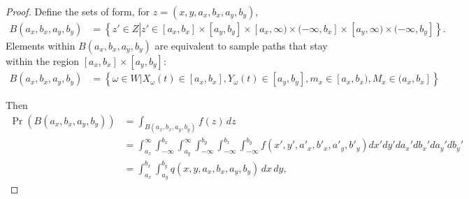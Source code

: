 \documentclass[10pt]{article}
\begin{document}
\begin{proof}
  Define the sets of form, for $z = (x,y,a_x,b_x,a_y,b_y)$,
  \begin{align*}
    B(a_x, b_x, a_y, b_y) &= \left\{ z' \in Z \left| z' \in [a_x, b_x]
        \times [a_y, b_y] \times [a_x, \infty) \times (-\infty, b_x]
                            \times [a_y, \infty) \times (-\infty, b_y] \right.\right\}.
  \end{align*}
  Elements within $B(a_x, b_x, a_y, b_y)$ are equivalent to sample paths that stay within the region $[a_x, b_x] \times [a_y, b_y]$:
  \begin{align*}
    B(a_x, b_x, a_y, b_y) &= \left\{ \omega \in W | X_\omega(t) \in [a_x, b_x], Y_\omega(t) \in [a_y, b_y], m_x \in [a_x,b_x), M_x \in (a_x, b_x] \right\}
  \end{align*}

  Then
  \begin{align}
    \Pr(B(a_x, b_x, a_y, b_y)) &= \displaystyle \int_{B(a_x, b_x, a_y, b_y)} f(z)\, dz \nonumber \\ 
                               &= \displaystyle \int_{a_x}^{\infty} \displaystyle \int_{-\infty}^{b_x} \displaystyle \int_{a_y}^{\infty} \displaystyle \int_{-\infty}^{b_y} \displaystyle \int_{-\infty}^{b_x} \displaystyle \int_{-\infty}^{b_y} f(x', y', a'_x, b'_x, a'_y, b'_y) dx' dy' da_x' db_x' da_y' db_y' \label{eq:full-form} \\
                               &= \displaystyle \int_{a_x}^{b_x} \displaystyle \int_{a_y}^{b_y} q(x,y,a_x,b_x,a_y,b_y)\, dx\, dy, \nonumber
  \end{align}
  

\end{proof}
\end{document}
